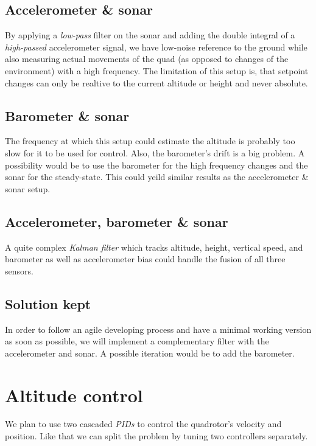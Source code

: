 \documentclass{repMobRob}
\begin{document}
\subsection{Accelerometer \& sonar}
By applying a \emph{low-pass} filter on the sonar and adding the double integral of a \emph{high-passed} accelerometer signal, we have low-noise reference to the ground while also measuring actual movements of the quad (as opposed to changes of the environment) with a high frequency.
The limitation of this setup is, that setpoint changes can only be realtive to the current altitude or height and never absolute.

\subsection{Barometer \& sonar}
The frequency at which this setup could estimate the altitude is probably too slow for it to be used for control.
Also, the barometer's drift is a big problem.
A possibility would be to use the barometer for the high frequency changes and the sonar for the steady-state.
This could yeild similar results as the accelerometer \& sonar setup.

\subsection{Accelerometer, barometer \& sonar}
A quite complex \emph{Kalman filter} which tracks altitude, height, vertical speed, and barometer as well as accelerometer bias could handle the fusion of all three sensors.

\subsection{Solution kept}
In order to follow an agile developing process and have a minimal working version as soon as possible, we will implement a complementary filter with the accelerometer and sonar.
A possible iteration would be to add the barometer.

\section{Altitude control}
We plan to use two cascaded \emph{PIDs} to control the quadrotor's velocity and position. Like that we can split the problem by tuning two controllers separately.
\end{document}
